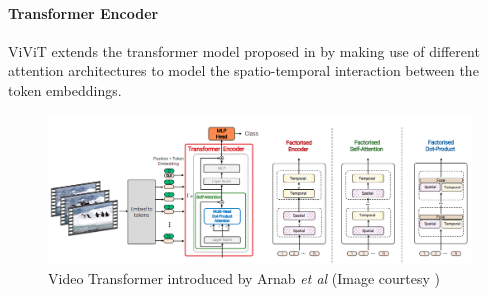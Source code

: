 \paragraph{Transformer Encoder}

\par ViViT extends the transformer model proposed in \cite{vit} by making use of different attention architectures to model the spatio-temporal interaction between the token embeddings. \par

\begin{figure}[h]
	\includegraphics[width=\linewidth]{assets/img/vivit.png}
	\caption{Video Transformer introduced by Arnab \textit{et al} (Image courtesy \cite{vivit})}
\end{figure}

